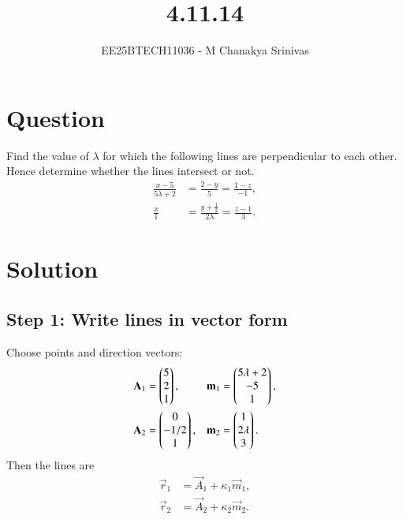 \documentclass[journal]{IEEEtran}
\begin{document}

\vspace{3cm}

\title{4.11.14}
\author{EE25BTECH11036 - M Chanakya Srinivas}
\maketitle

\renewcommand{\thetable}{\theenumi}
\setlength{\intextsep}{10pt}
\renewcommand\theequation{\arabic{equation}}


\section*{Question}
Find the value of \(\lambda\) for which the following lines are perpendicular to each other.
Hence determine whether the lines intersect or not.
\begin{align}
\frac{x-5}{5\lambda+2} &= \frac{2-y}{5} = \frac{1-z}{-1}, \label{eq:l1}\\
\frac{x}{1} &= \frac{y+\tfrac{1}{2}}{2\lambda} = \frac{z-1}{3}. \label{eq:l2}
\end{align}

\section*{Solution }

\subsection*{Step 1: Write lines in vector form}
Choose points and direction vectors:
\begin{align}
\mathbf A_1 &= \begin{pmatrix}5\\2\\1\end{pmatrix}, & \mathbf m_1 &= \begin{pmatrix}5\lambda+2\\-5\\1\end{pmatrix}, \label{A1m1}\\
\mathbf A_2 &= \begin{pmatrix}0\\-1/2\\1\end{pmatrix}, & \mathbf m_2 &= \begin{pmatrix}1\\2\lambda\\3\end{pmatrix}. \label{A2m2}
\end{align}
Then the lines are
\begin{align}
\vec r_1 &= \vec A_1 + \kappa_1 \vec m_1, \\
\vec r_2 &= \vec A_2 + \kappa_2 \vec m_2.
\end{align}
\end{document}
